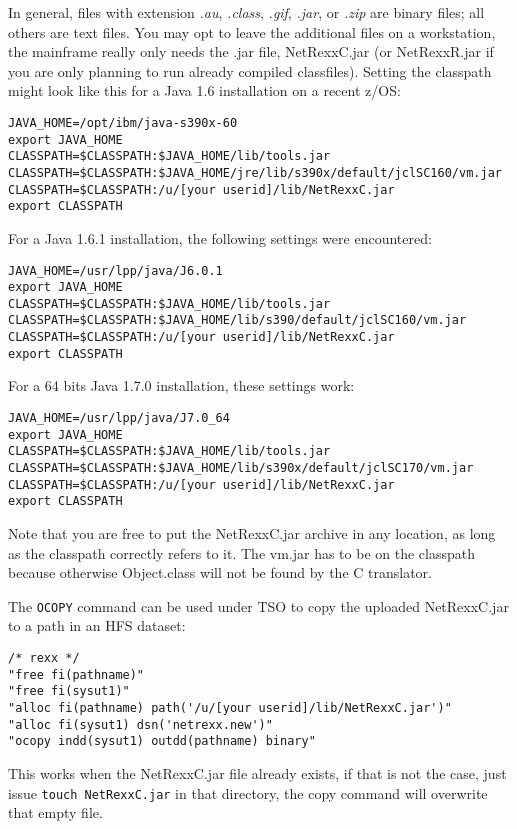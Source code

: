 In general, files with extension \emph{.au}, \emph{.class}, \emph{.gif}, \emph{.jar},
or \emph{.zip} are binary files; all others are text files. You may
opt to leave the additional files on a workstation, the mainframe
really only needs the .jar file, NetRexxC.jar (or NetRexxR.jar if you
are only planning to run already compiled classfiles).
Setting the classpath might look like this for a Java 1.6 installation
on a recent z/OS:
\begin{verbatim}
JAVA_HOME=/opt/ibm/java-s390x-60
export JAVA_HOME
CLASSPATH=$CLASSPATH:$JAVA_HOME/lib/tools.jar
CLASSPATH=$CLASSPATH:$JAVA_HOME/jre/lib/s390x/default/jclSC160/vm.jar
CLASSPATH=$CLASSPATH:/u/[your userid]/lib/NetRexxC.jar
export CLASSPATH
\end{verbatim}
For a Java 1.6.1 installation, the following settings were
encountered:
\begin{verbatim}
JAVA_HOME=/usr/lpp/java/J6.0.1
export JAVA_HOME
CLASSPATH=$CLASSPATH:$JAVA_HOME/lib/tools.jar
CLASSPATH=$CLASSPATH:$JAVA_HOME/lib/s390/default/jclSC160/vm.jar
CLASSPATH=$CLASSPATH:/u/[your userid]/lib/NetRexxC.jar
export CLASSPATH
\end{verbatim}
For a 64 bits Java 1.7.0 installation, these settings work:
\begin{verbatim}
JAVA_HOME=/usr/lpp/java/J7.0_64
export JAVA_HOME
CLASSPATH=$CLASSPATH:$JAVA_HOME/lib/tools.jar
CLASSPATH=$CLASSPATH:$JAVA_HOME/lib/s390x/default/jclSC170/vm.jar
CLASSPATH=$CLASSPATH:/u/[your userid]/lib/NetRexxC.jar
export CLASSPATH
\end{verbatim}

Note that you are free to put the NetRexxC.jar archive in any
location, as long as the classpath correctly refers to it. The vm.jar
has to be on the classpath because otherwise Object.class will not be
found by the \nr{}C translator.

The \texttt{OCOPY} command can be used under TSO to copy the uploaded
NetRexxC.jar to a path in an HFS dataset:
\begin{verbatim}
/* rexx */                                             
"free fi(pathname)"                                    
"free fi(sysut1)"                                      
"alloc fi(pathname) path('/u/[your userid]/lib/NetRexxC.jar')"
"alloc fi(sysut1) dsn('netrexx.new')"                  
"ocopy indd(sysut1) outdd(pathname) binary"            
\end{verbatim}
This works when the NetRexxC.jar file already exists, if that is not the
case, just issue \texttt{touch NetRexxC.jar} in that directory, the
copy command will overwrite that empty file.

